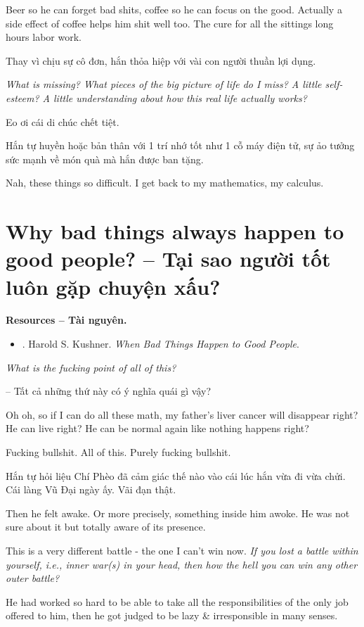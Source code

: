 \documentclass[12pt,twoside]{book}
\begin{document}
Beer so he can forget bad shits, coffee so he can focus on the good. Actually a side effect of coffee helps him shit well too. The cure for all the sittings long hours labor work.

Thay vì chịu sự cô đơn, hắn thỏa hiệp với vài con người thuần lợi dụng. 

{\it What is missing? What pieces of the big picture of life do I miss? A little self-esteem? A little understanding about how this real life actually works?}

Eo ơi cái di chúc chết tiệt.

Hắn tự huyền hoặc bản thân với 1 trí nhớ tốt như 1 cỗ máy điện tử, sự ảo tưởng sức mạnh về món quà mà hắn được ban tặng.

Nah, these things so difficult. I get back to my mathematics, my calculus.

\section{Why bad things always happen to good people? -- Tại sao người tốt luôn gặp chuyện xấu?}
{\bf \textsf{Resources -- Tài nguyên.}}
\begin{itemize}
	\item \cite{Kushner_bad_things_good_people}. {\sc Harold S. Kushner}. {\it When Bad Things Happen to Good People}.
\end{itemize}

{\it What is the fucking point of all of this?}

-- Tất cả những thứ này có ý nghĩa quái gì vậy?

Oh oh, so if I can do all these math, my father's liver cancer will disappear right? He can live right? He can be normal again like nothing happens right?

Fucking bullshit. All of this. Purely fucking bullshit.

Hắn tự hỏi liệu Chí Phèo đã cảm giác thế nào vào cái lúc hắn vừa đi vừa chửi. Cái làng Vũ Đại ngày ấy. Vãi đạn thật.


Then he felt awake. Or more precisely, something inside him awoke. He was not sure about it but totally aware of its presence.

This is a very different battle - the one I can't win now. {\it If you lost a battle within yourself, i.e., inner war(s) in your head, then how the hell you can win any other outer battle?}

He had worked so hard to be able to take all the responsibilities of the only job offered to him, then he got judged to be lazy \& irresponsible in many senses.
\end{document}
